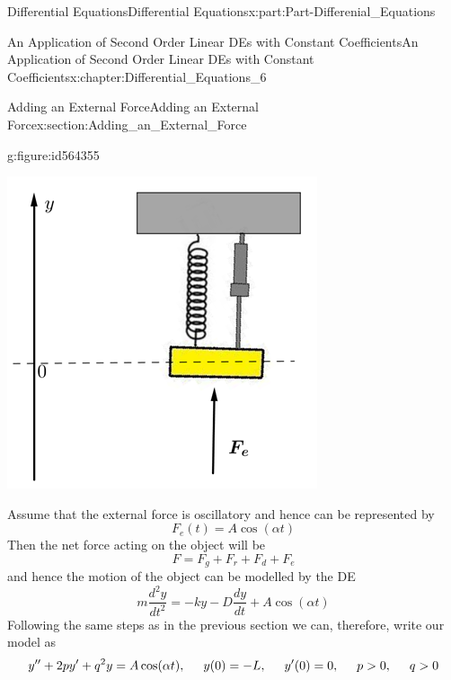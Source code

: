 \documentclass[oneside,10pt,]{book}
\numberwithin{equation}{section}
\newcommand{\gt}{>}
\begin{document}
\begin{partptx}{Differential Equations}{}{Differential Equations}{}{}{x:part:Part-Differenial_Equations}
\begin{chapterptx}{An Application of Second Order Linear DEs with Constant Coefficients}{}{An Application of Second Order Linear DEs with Constant Coefficients}{}{}{x:chapter:Differential_Equations_6}
\begin{sectionptx}{Adding an External Force}{}{Adding an External Force}{}{}{x:section:Adding_an_External_Force}
\begin{figureptx}{}{g:figure:id564355}{}
\begin{image}{0.2}{0.6}{0.2}%
\includegraphics[width=\linewidth]{./DifferentialEquations/Images/6/figure_8.png}
\end{image}%
\tcblower
\end{figureptx}%
 Assume that the external force is oscillatory and hence can be represented by%
\begin{equation*}
F_e(t)=A\cos(\alpha t)
\end{equation*}
Then the net force acting on the object will be%
\begin{equation*}
F=F_g+F_r+F_d+F_e
\end{equation*}
and hence the motion of the object can be modelled by the DE%
\begin{equation*}
m\frac{d^2y}{dt^2}=-ky-D\frac{dy}{dt}+A\cos(\alpha t)
\end{equation*}
Following the same steps as in the previous section we can, therefore, write our model as%
\begin{equation}
y''+2py'+q^2y=A\cos(\alpha t),\hspace{5mm} y(0)=-L,\hspace{5mm} y'(0)=0,\hspace{5mm} p\gt 0,\hspace{5mm} q\gt 0\label{g:men:id564358}
\end{equation}

\end{sectionptx}
\end{chapterptx}
\end{partptx}
\end{document}

